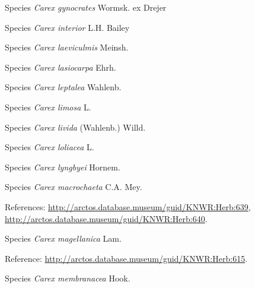 \documentclass[9pt, article]{memoir}
\begin{document}
\begin{multicols}{2}
\vspace{6pt}\noindent\hspace{36pt}Species \textit{Carex gynocrates} Wormsk. ex Drejer


\vspace{6pt}\noindent\hspace{36pt}Species \textit{Carex interior} L.H. Bailey


\vspace{6pt}\noindent\hspace{36pt}Species \textit{Carex laeviculmis} Meinsh.


\vspace{6pt}\noindent\hspace{36pt}Species \textit{Carex lasiocarpa} Ehrh.


\vspace{6pt}\noindent\hspace{36pt}Species \textit{Carex leptalea} Wahlenb.


\vspace{6pt}\noindent\hspace{36pt}Species \textit{Carex limosa} L.


\vspace{6pt}\noindent\hspace{36pt}Species \textit{Carex livida} (Wahlenb.) Willd.


\vspace{6pt}\noindent\hspace{36pt}Species \textit{Carex loliacea} L.


\vspace{6pt}\noindent\hspace{36pt}Species \textit{Carex lyngbyei} Hornem.


\vspace{6pt}\noindent\hspace{36pt}Species \textit{Carex macrochaeta} C.A. Mey.


\vspace{6pt}References: 
\url{http://arctos.database.museum/guid/KNWR:Herb:639}, 
\url{http://arctos.database.museum/guid/KNWR:Herb:640}.

\vspace{6pt}\noindent\hspace{36pt}Species \textit{Carex magellanica} Lam.


\vspace{6pt}Reference: 
\url{http://arctos.database.museum/guid/KNWR:Herb:615}.

\vspace{6pt}\noindent\hspace{36pt}Species \textit{Carex membranacea} Hook.



\end{multicols}
\end{document}
